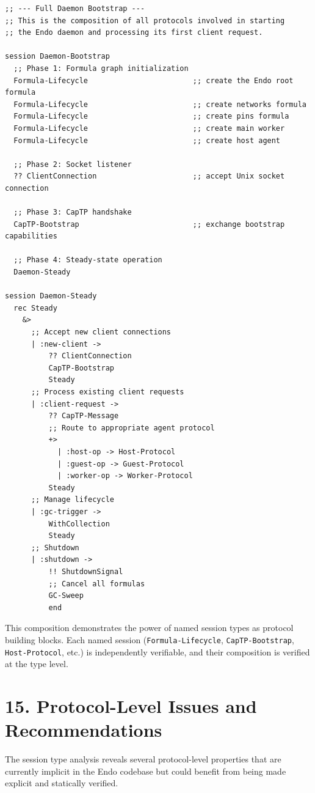 \documentclass[11pt]{article}
\begin{document}
\begin{verbatim}
;; --- Full Daemon Bootstrap ---
;; This is the composition of all protocols involved in starting
;; the Endo daemon and processing its first client request.

session Daemon-Bootstrap
  ;; Phase 1: Formula graph initialization
  Formula-Lifecycle                        ;; create the Endo root formula
  Formula-Lifecycle                        ;; create networks formula
  Formula-Lifecycle                        ;; create pins formula
  Formula-Lifecycle                        ;; create main worker
  Formula-Lifecycle                        ;; create host agent

  ;; Phase 2: Socket listener
  ?? ClientConnection                      ;; accept Unix socket connection

  ;; Phase 3: CapTP handshake
  CapTP-Bootstrap                          ;; exchange bootstrap capabilities

  ;; Phase 4: Steady-state operation
  Daemon-Steady

session Daemon-Steady
  rec Steady
    &>
      ;; Accept new client connections
      | :new-client ->
          ?? ClientConnection
          CapTP-Bootstrap
          Steady
      ;; Process existing client requests
      | :client-request ->
          ?? CapTP-Message
          ;; Route to appropriate agent protocol
          +>
            | :host-op -> Host-Protocol
            | :guest-op -> Guest-Protocol
            | :worker-op -> Worker-Protocol
          Steady
      ;; Manage lifecycle
      | :gc-trigger ->
          WithCollection
          Steady
      ;; Shutdown
      | :shutdown ->
          !! ShutdownSignal
          ;; Cancel all formulas
          GC-Sweep
          end
\end{verbatim}

This composition demonstrates the power of named session types as protocol
building blocks. Each named session (\texttt{Formula-Lifecycle}, \texttt{CapTP-Bootstrap},
\texttt{Host-Protocol}, etc.) is independently verifiable, and their composition
is verified at the type level.
\section{15. Protocol-Level Issues and Recommendations}
\label{sec:org35c65a1}

The session type analysis reveals several protocol-level properties that are
currently implicit in the Endo codebase but could benefit from being made
explicit and statically verified.
\end{document}
